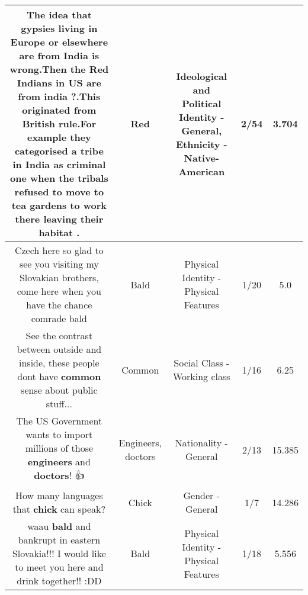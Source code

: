 \documentclass[11pt]{article}
\newlength\mylength
\begin{document}
\begin{center}
\begin{longtable}{|C{.65\mylength}|C{.30\mylength}|C{.12\mylength}|C{.12\mylength}|C{.12\mylength}|}
  \small The idea that gypsies living in Europe or elsewhere are from India is wrong.Then the \textbf{R\textbf{ed}} Indians in US are from india ?.This originated from British rule.For example they categorised a tribe  in India as criminal one when the tribals refused to move to tea gardens to work there leaving their habitat .\normalsize   & Red &  Ideological and Political Identity - General, Ethnicity - Native-American & 2/54 & 3.704 \\  \hline
  \small Czech here so glad to see you visiting my Slovakian brothers, come here when you have the chance comrade bald\normalsize   & Bald & Physical Identity - Physical Features & 1/20 & 5.0 \\  \hline
  \small See the contrast between outside and inside, these people dont have \textbf{common} sense about public stuff...\normalsize   & Common & Social Class - Working class & 1/16 & 6.25 \\  \hline
  \small The US Government wants to import millions of those \textbf{engineers} and \textbf{doctors}! 👍\normalsize   & Engineers, doctors & Nationality - General & 2/13 & 15.385 \\  \hline
  \small How many languages that \textbf{chick} can speak?\normalsize   & Chick & Gender - General & 1/7 & 14.286 \\  \hline
  \small waau \textbf{bald} and bankrupt in eastern Slovakia!!!  I would like to meet you here and drink together!! :DD\normalsize   & Bald & Physical Identity - Physical Features & 1/18 & 5.556 \\  \hline

\end{longtable}
\end{center}
\end{document}
